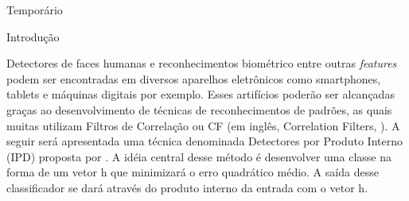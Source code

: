 

Temporário

Introdução

Detectores de faces humanas e reconhecimentos biométrico entre outras \textit{features} podem ser encontradas em diversos aparelhos eletrônicos como smartphones, tablets e máquinas digitais por exemplo. Esses artifícios poderão ser alcançadas graças ao desenvolvimento de técnicas de reconhecimentos de padrões, as quais muitas utilizam Filtros de Correlação ou CF (em inglês, Correlation Filters, \cite{kumar}). A seguir será apresentada uma técnica denominada Detectores por Produto Interno (IPD) proposta por \cite{fundamentos1}. A idéia central desse método é desenvolver uma classe na forma de um vetor h que minimizará o erro quadrático médio. A saída desse classificador se dará através do produto interno da entrada com o vetor h.
